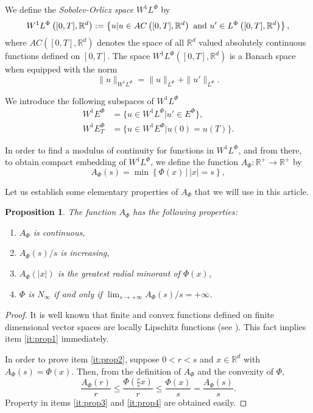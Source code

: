 \documentclass[twoside]{article}
\newtheorem{prop}[thm]{Proposition}
\theoremstyle{remark}
\newcommand{\orlnor}{\|_{L^{\Phi}}}
\newcommand{\lphi}{L^{\Phi}}
\newcommand{\ephi}{E^{\Phi}}
\newcommand{\wphi}{W^{1}\lphi}
\newcommand{\wphie}{W^{1}\ephi}
\newcommand{\rr}{\mathbb{R}}
\renewcommand{\leq}{\leqslant}
\begin{document}
We define the \emph{Sobolev-Orlicz space} $\wphi$ by
\[\wphi\left([0,T],\rr^d\right):=\left\{u| u\in AC\left([0,T],\rr^d\right) \hbox{ and } u'\in \lphi\left([0,T],\rr^d\right)\right\},\]
where $AC\left([0,T],\rr^d\right)$ denotes the space of all $\rr^d$ valued absolutely continuous functions defined on $[0,T]$. The space $\wphi\left([0,T],\rr^d\right)$ is a Banach space when equipped with the norm
\begin{equation}\label{def-norma-orlicz-sob}
\|  u  \|_{\wphi}= \|  u  \|_{\lphi} + \|u'\orlnor.
\end{equation}

We introduce the following subspaces of $\wphi$
\begin{equation}\label{def-esp-orlicz-sob-per}
\begin{split}
\wphie&=\{u\in\wphi|u'\in\ephi\},\\
\wphie_T&=\{u\in\wphie|u(0)=u(T)\}.
\end{split}
\end{equation}


In order to find a modulus of continuity for functions in $\wphi$, and from there, to obtain compact embedding of $\wphi$, we define the function $A_{\Phi}:\rr^+\to\rr^+$ by
\begin{equation}\label{eq:inversa-gral}
A_{\Phi}(s)=\min\left\{\Phi(x)\,\big|\,|x|=s\right\},
\end{equation}

Let us establish some elementary properties of $A_{\Phi}$ that we will use in this article.
\begin{prop}\label{prop:AsubPhi} The function $A_{\Phi}$ has the following properties:
\begin{enumerate}
 \item\label{it:prop1} $A_{\Phi}$ is continuous,
 \item\label{it:prop2} $A_{\Phi}(s)/s$ is increasing,
 \item\label{it:prop3} $A_{\Phi}(|x|)$ is the \emph{greatest radial minorant} of 
 $\Phi(x)$,
 \item\label{it:prop4} $\Phi$ is $N_{\infty}$ if and only if $\lim_{s\to+\infty} A_{\Phi}(s)/s=+\infty$.
\end{enumerate}
\end{prop}

\begin{proof} It is well known that finite and convex functions defined on finite dimensional 
vector spaces are locally Lipschitz functions (see \cite{clarke2013functional}). This fact 
implies item \ref{it:prop1} immediately. 

In order to prove item \ref{it:prop2}, suppose $0<r<s$ and $x\in\rr^d$ with $A_{\Phi}(s)
=\Phi(x)$. Then, from the definition of $A_{\Phi}$ and the convexity of $\Phi$,
\[\frac{A_{\Phi}(r)}{r}\leq \frac{\Phi\left(\frac{r}{s}x\right)}{r}\leq \frac{\Phi\left(x\right)}{s}=
 \frac{A_{\Phi}(s)}{s}.
\]
Property in items \ref{it:prop3} and \ref{it:prop4} are obtained easily.

 
\end{proof}
\end{document}
